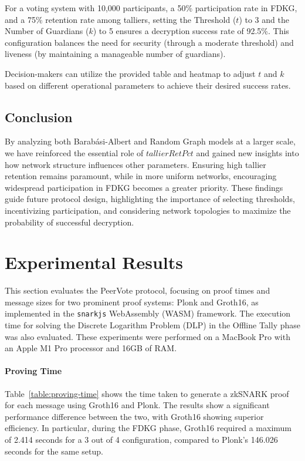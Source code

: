 \documentclass[runningheads]{llncs}
\begin{document}
For a voting system with 10,000 participants, a 50\% participation rate in FDKG, and a 75\% retention rate among talliers, setting the Threshold ($t$) to 3 and the Number of Guardians ($k$) to 5 ensures a decryption success rate of 92.5\%. This configuration balances the need for security (through a moderate threshold) and liveness (by maintaining a manageable number of guardians).

Decision-makers can utilize the provided table and heatmap to adjust $t$ and $k$ based on different operational parameters to achieve their desired success rates.

\subsection{Conclusion}

By analyzing both Barabási-Albert and Random Graph models at a larger scale, we have reinforced the essential role of $tallierRetPct$ and gained new insights into how network structure influences other parameters. Ensuring high tallier retention remains paramount, while in more uniform networks, encouraging widespread participation in FDKG becomes a greater priority. These findings guide future protocol design, highlighting the importance of selecting thresholds, incentivizing participation, and considering network topologies to maximize the probability of successful decryption.


\section{Experimental Results}

This section evaluates the PeerVote protocol, focusing on proof times and message sizes for two prominent proof systems: Plonk and Groth16, as implemented in the \texttt{snarkjs} WebAssembly (WASM) framework. The execution time for solving the Discrete Logarithm Problem (DLP) in the Offline Tally phase was also evaluated. These experiments were performed on a MacBook Pro with an Apple M1 Pro processor and 16GB of RAM.

\paragraph{Proving Time}

Table~\ref{table:proving-time} shows the time taken to generate a zkSNARK proof for each message using Groth16 and Plonk. The results show a significant performance difference between the two, with Groth16 showing superior efficiency. In particular, during the FDKG phase, Groth16 required a maximum of 2.414 seconds for a 3 out of 4 configuration, compared to Plonk's 146.026 seconds for the same setup.
\end{document}
